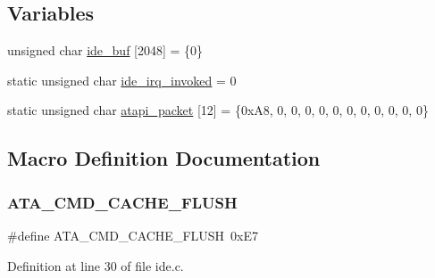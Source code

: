 \subsection*{Variables}
\begin{DoxyCompactItemize}
\item 
unsigned char \hyperlink{a00032_a94f78e77f368421e4fe8faea979d523f_a94f78e77f368421e4fe8faea979d523f}{ide\+\_\+buf} \mbox{[}2048\mbox{]} = \{0\}
\item 
static unsigned char \hyperlink{a00032_a12985ec2f925d0cdbd7d24728b9849f9_a12985ec2f925d0cdbd7d24728b9849f9}{ide\+\_\+irq\+\_\+invoked} = 0
\item 
static unsigned char \hyperlink{a00032_a02351861ecf3191d5dbbcc1910b7c109_a02351861ecf3191d5dbbcc1910b7c109}{atapi\+\_\+packet} \mbox{[}12\mbox{]} = \{0x\+A8, 0, 0, 0, 0, 0, 0, 0, 0, 0, 0, 0\}
\end{DoxyCompactItemize}


\subsection{Macro Definition Documentation}
\mbox{\label{a00032_a23e8deb17b95336898b52cc76d5206af_a23e8deb17b95336898b52cc76d5206af}} 
\subsubsection{\texorpdfstring{A\+T\+A\+\_\+\+C\+M\+D\+\_\+\+C\+A\+C\+H\+E\+\_\+\+F\+L\+U\+SH}{ATA\_CMD\_CACHE\_FLUSH}}
{\footnotesize\ttfamily \#define A\+T\+A\+\_\+\+C\+M\+D\+\_\+\+C\+A\+C\+H\+E\+\_\+\+F\+L\+U\+SH~0x\+E7}



Definition at line 30 of file ide.\+c.

\mbox{\label{a00032_a3c624c2041a51a473bd6e77b7753d475_a3c624c2041a51a473bd6e77b7753d475}} 

